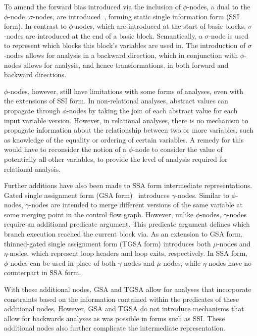To amend the forward bias introduced via the inclusion of $\phi$-nodes, a dual to the $\phi$-node, $\sigma$-nodes, are introduced~\cite{ananian2001static}, forming static single information form (SSI form). In contrast to $\phi$-nodes, which are introduced at the start of basic blocks, $\sigma$-nodes are introduced at the end of a basic block. Semantically, a $\sigma$-node is used to represent which blocks this block's variables are used in. The introduction of $\sigma$-nodes allows for analysis in a backward direction, which in conjunction with $\phi$-nodes allows for analysis, and hence transformations, in both forward and backward directions.

$\phi$-nodes, however, still have limitations with some forms of analyses, even with the extensions of SSI form. In non-relational analyses, abstract values can propagate through $\phi$-nodes by taking the join of each abstract value for each input variable version. However, in relational analyses, there is no mechanism to propagate information about the relationship between two or more variables, such as knowledge of the equality or ordering of certain variables. A remedy for this would have to reconsider the notion of a $\phi$-node to consider the value of potentially all other variables, to provide the level of analysis required for relational analysis.

Further additions have also been made to SSA form intermediate representations. Gated single assignment form (GSA form)~\cite{ottenstein1990program} introduces $\gamma$-nodes. Similar to $\phi$-nodes, $\gamma$-nodes are intended to merge different versions of the same variable at some merging point in the control flow graph. However, unlike $\phi$-nodes, $\gamma$-nodes require an additional predicate argument. This predicate argument defines which branch execution reached the current block via. As an extension to GSA form, thinned-gated single assignment form (TGSA form) introduces both $\mu$-nodes and $\eta$-nodes, which represent loop headers and loop exits, respectively. In SSA form, $\phi$-nodes can be used in place of both $\gamma$-nodes and $\mu$-nodes, while $\eta$-nodes have no counterpart in SSA form. 

With these additional nodes, GSA and TGSA allow for analyses that incorporate constraints based on the information contained within the predicates of these additional nodes. However, GSA and TGSA do not introduce mechanisms that allow for backwards analyses as was possible in forms such as SSI. These additional nodes also further complicate the intermediate representation.

